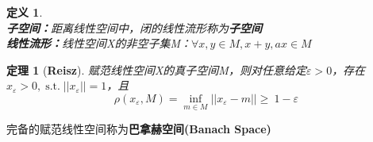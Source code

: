 \documentclass[12pt, a4paper, oneside, fontset=windows]{ctexbook}
\newtheorem{theorem}{定理}[section]
\newtheorem{definition}{定义}[section]
\DeclareMathOperator{\st}{\mathrm{s.t.}}
\begin{document}
    \begin{definition}
        \ \\
        \textbf{子空间：}距离线性空间中，闭的线性流形称为\textbf{子空间}\\
        \textbf{线性流形：}线性空间X的非空子集M：$\forall x,y \in M , x + y,ax \in M$
    \end{definition}

    \begin{theorem}[\textbf{Reisz}]
        赋范线性空间X的真子空间M，则对任意给定$\varepsilon >0$，存在$x_\varepsilon >0,\st ||x_{\varepsilon}||=1$，且    
        \[
        \rho (x_{\varepsilon},M)=\inf_{m\in M}||x_{\varepsilon}-m|| \ge \ 1-\varepsilon
        \]
    \end{theorem}

    完备的赋范线性空间称为\textbf{巴拿赫空间(Banach Space)}\\
\end{document}
